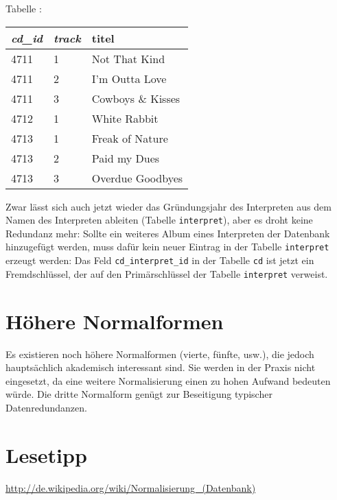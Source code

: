 \begin{minipage}{1.0\textwidth}
Tabelle :

\vspace{2mm}

\begin{tabular}{|l|l|l|}\hline
\textbf{\em cd\_id} & \textbf{\em track} & \textbf{titel}\\ \hline
4711 & 1 & Not That Kind\\ \hline
4711 & 2 & I'm Outta Love\\ \hline
4711 & 3 & Cowboys \& Kisses\\ \hline
4712 & 1 & White Rabbit\\ \hline
4713 & 1 & Freak of Nature\\ \hline
4713 & 2 & Paid my Dues\\ \hline
4713 & 3 & Overdue Goodbyes\\ \hline
\end{tabular}
\end{minipage}

Zwar lässt sich auch jetzt wieder das Gründungsjahr des Interpreten aus dem
Namen des Interpreten ableiten (Tabelle \lstinline|interpret|), aber es droht
keine Redundanz mehr: Sollte ein weiteres Album eines Interpreten der Datenbank
hinzugefügt werden, muss dafür kein neuer Eintrag in der Tabelle
\lstinline|interpret| erzeugt werden: Das Feld \lstinline|cd_interpret_id| in
der Tabelle \lstinline|cd| ist jetzt ein Fremdschlüssel, der auf den
Primärschlüssel der Tabelle \lstinline|interpret| verweist.


\section{Höhere Normalformen}

Es existieren noch höhere Normalformen (vierte, fünfte, usw.), die jedoch
hauptsächlich akademisch interessant sind. Sie werden in der Praxis nicht
eingesetzt, da eine weitere Normalisierung einen zu hohen Aufwand bedeuten
würde. Die dritte Normalform genügt zur Beseitigung typischer Datenredundanzen.


\section{Lesetipp}

\url{http://de.wikipedia.org/wiki/Normalisierung_(Datenbank)}